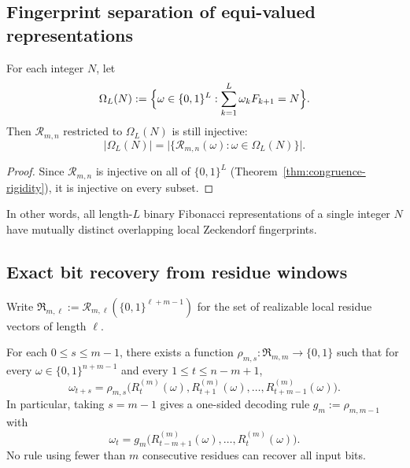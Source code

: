 \subsection{Fingerprint separation of equi-valued representations}

\begin{corollary}
\label{cor:fingerprint-separation}
For each integer $N$, let
\[
\Omega_L(N):=
\Bigl\{
\omega\in\{0,1\}^L:
\sum_{k=1}^L\omega_kF_{k+1}=N
\Bigr\}.
\]
Then $\mathcal R_{m,n}$ restricted to $\Omega_L(N)$ is still injective:
\[
\lvert\Omega_L(N)\rvert
=
\bigl\lvert\{\mathcal R_{m,n}(\omega):\omega\in\Omega_L(N)\}\bigr\rvert.
\]
\end{corollary}

\begin{proof}
Since $\mathcal R_{m,n}$ is injective on all of $\{0,1\}^L$
(Theorem~\ref{thm:congruence-rigidity}), it is injective on every subset.
\end{proof}

In other words, all length-$L$ binary Fibonacci representations of a single
integer $N$ have mutually distinct overlapping local Zeckendorf fingerprints.

\subsection{Exact bit recovery from residue windows}

Write
$\mathfrak R_{m,\ell}:=\mathcal R_{m,\ell}(\{0,1\}^{\ell+m-1})$
for the set of realizable local residue vectors of length $\ell$.

\begin{theorem}
\label{thm:bit-recovery-residues}
For each $0\le s\le m-1$, there exists a function
$\rho_{m,s}:\mathfrak R_{m,m}\to\{0,1\}$ such that for every
$\omega\in\{0,1\}^{n+m-1}$ and every $1\le t\le n-m+1$,
\[
\omega_{t+s}
=
\rho_{m,s}\bigl(
R_t^{(m)}(\omega),R_{t+1}^{(m)}(\omega),\ldots,R_{t+m-1}^{(m)}(\omega)
\bigr).
\]
In particular, taking $s=m-1$ gives a one-sided decoding rule
$g_m:=\rho_{m,m-1}$ with
\[
\omega_t=g_m\bigl(R_{t-m+1}^{(m)}(\omega),\ldots,R_t^{(m)}(\omega)\bigr).
\]
No rule using fewer than $m$ consecutive residues can recover all input bits.
\end{theorem}

